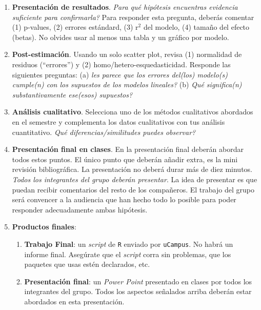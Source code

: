 \documentclass[10pt]{article}
\begin{document}
\begin{enumerate}
	\item {\bf Presentaci\'on de resultados}. \emph{Para qu\'e hip\'otesis encuentras evidencia suficiente para confirmarla?} Para responder esta pregunta, deber\'as comentar (1) p-values, (2) errores est\'andard, (3) r$^{2}$ del modelo, (4) tama\~no del efecto (betas). No olvides usar al menos una tabla y un gr\'afico por modelo.

	\item {\bf Post-estimaci\'on}. Usando un solo scatter plot, revisa (1) normalidad de residuos (``errores'') y (2) homo/hetero-esquedasticidad. Responde las siguientes preguntas: (a) \emph{les parece que los errores del(los) modelo(s) cumple(n) con los supuestos de los modelos lineales?} (b) \emph{Qu\'e significa(n) substantivamente ese(esos) supuestos?}

  \item {\bf An\'alisis cualitativo}. Selecciona uno de los m\'etodos cualitativos abordados en el semestre y complementa los datos cualitativos con tus an\'alisis cuantitativo. \emph{Qu\'e diferencias/similitudes puedes observar?}

	\item {\bf Presentaci\'on final en clases}. En la presentaci\'on final deber\'an abordar todos estos puntos. El \'unico punto que deber\'an a\~nadir extra, es la mini revisi\'on bibliogr\'afica. La presentaci\'on no deber\'a durar m\'as de diez minutos. \emph{Todos los integrantes del grupo deber\'an presentar}. La idea de presentar es que puedan recibir comentarios del resto de los compa\~neros. El trabajo del grupo ser\'a convencer a la audiencia que han hecho todo lo posible para poder responder adecuadamente ambas hip\'otesis.

	\item {\bf Productos finales}: 

		\begin{enumerate}
			\item {\bf Trabajo Final}: un \emph{script} de \texttt{R} enviado por \texttt{uCampus}. No habr\'a un informe final. Aseg\'urate que el \emph{script} corra sin problemas, que los paquetes que usas est\'en declarados, etc.
			\item {\bf Presentaci\'on final}: un \emph{Power Point} presentado en clases por todos los integrantes del grupo. Todos los aspectos se\~nalados arriba deber\'an estar abordados en esta presentaci\'on.
		\end{enumerate}

\end{enumerate}
\end{document}
